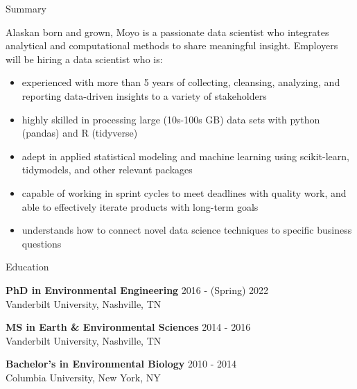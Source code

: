 \documentclass{resume} %
\begin{document}

\begin{rSection}{Summary}

Alaskan born and grown, Moyo is a passionate data scientist who integrates analytical and computational methods to share meaningful insight. Employers will be hiring a data scientist who is:
{\begin{itemize}
    \item {experienced with more than 5 years of collecting, cleansing, analyzing, and reporting data-driven insights to a variety of stakeholders}
    \item {highly skilled in processing large (10s-100s GB) data sets with python (pandas) and R (tidyverse)}
    \item {adept in applied statistical modeling and machine learning using scikit-learn, tidymodels, and other relevant packages}
    \item {capable of working in sprint cycles to meet deadlines with quality work, and able to effectively iterate products with long-term goals}    
    \item {understands how to connect novel data science techniques to specific business questions}
\end{itemize} }

\end{rSection}


\begin{rSection}{Education}

{\bf PhD in Environmental Engineering} \hfill {2016 - (Spring) 2022}
\\ 
Vanderbilt University, Nashville, TN 

{\bf MS in Earth \& Environmental Sciences}  \hfill {2014 - 2016}
\\
Vanderbilt University, Nashville, TN
 
{\bf Bachelor's in Environmental Biology}  \hfill {2010 - 2014}
\\
Columbia University, New York, NY

\end{rSection}
\end{document}
